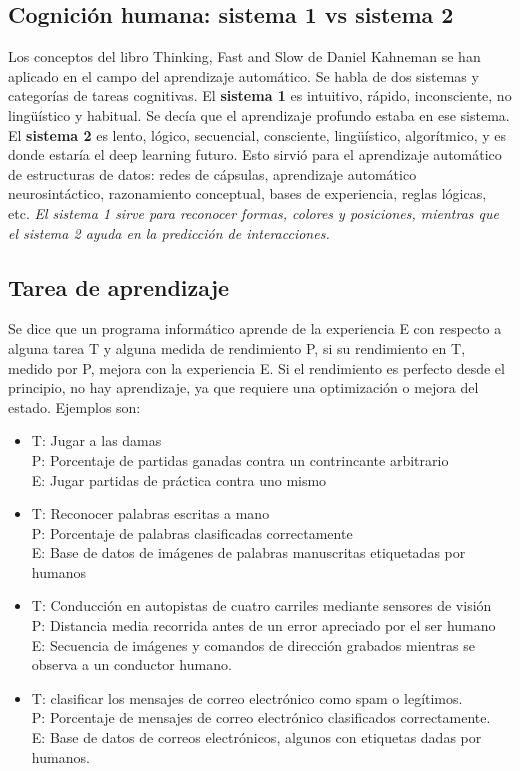\subsection{Cognición humana: sistema 1 vs sistema 2}
Los conceptos del libro Thinking, Fast and Slow de Daniel Kahneman se han aplicado en el campo del aprendizaje automático. Se habla de dos sistemas y categorías de tareas cognitivas. El \textbf{sistema 1} es intuitivo, rápido, inconsciente, no lingüístico y habitual. Se decía que el aprendizaje profundo estaba en ese sistema. El \textbf{sistema 2} es lento, lógico, secuencial, consciente, lingüístico, algorítmico, y es donde estaría el deep learning futuro. Esto sirvió para el aprendizaje automático de estructuras de datos: redes de cápsulas, aprendizaje automático neurosintáctico, razonamiento conceptual, bases de experiencia, reglas lógicas, etc. \textit{El sistema 1 sirve para reconocer formas, colores y posiciones, mientras que el sistema 2 ayuda en la predicción de interacciones.}

\subsection{Tarea de aprendizaje}
Se dice que un programa informático aprende de la experiencia E con respecto a alguna tarea T y alguna medida de rendimiento P, si su rendimiento en T, medido por P, mejora con la experiencia E. Si el rendimiento es perfecto desde el principio, no hay aprendizaje, ya que requiere una optimización o mejora del estado. Ejemplos son:
\begin{itemize}
\item T: Jugar a las damas \\ P: Porcentaje de partidas ganadas contra un contrincante arbitrario \\ E: Jugar partidas de práctica contra uno mismo
\item T: Reconocer palabras escritas a mano \\ P: Porcentaje de palabras clasificadas correctamente \\ E: Base de datos de imágenes de palabras manuscritas etiquetadas por humanos
\item T: Conducción en autopistas de cuatro carriles mediante sensores de visión \\ P: Distancia media recorrida antes de un error apreciado por el ser humano \\ E: Secuencia de imágenes y comandos de dirección grabados mientras se observa a un conductor humano.
\item T: clasificar los mensajes de correo electrónico como spam o legítimos. \\ P: Porcentaje de mensajes de correo electrónico clasificados correctamente. \\ E: Base de datos de correos electrónicos, algunos con etiquetas dadas por humanos.
\end{itemize}

